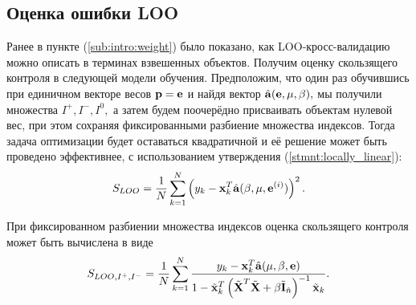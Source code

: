 
\subsection{Оценка ошибки LOO}
Ранее в пункте (\ref{sub:intro:weight}) было показано, как LOO-кросс-валидацию можно описать в терминах взвешенных объектов.
Получим оценку скользящего контроля в следующей модели обучения. Предположим, что один раз обучившись при единичном векторе весов $\boldsymbol{\mathbf{p}} = \boldsymbol{\mathbf{e}}$ и найдя вектор $\hat{\boldsymbol{\mathbf{a}}}(\boldsymbol{\mathbf{e}}, {\mu,\beta}),$ мы получили множества $I^+, I^-, I^0,$ а затем будем поочерёдно присваивать объектам нулевой вес, при этом сохраняя фиксированными разбиение множества индексов. Тогда задача оптимизации будет оставаться квадратичной и её решение может быть проведено эффективнее, с использованием утверждения (\ref{stmnt:locally_linear}):
\begin{equation}
	S_{LOO} = \frac1N\sum\limits_{k=1}^N \left(y_k - \boldsymbol{\mathbf{x}}_k^T\hat{\boldsymbol{\mathbf{a}}}(\beta, \mu, \boldsymbol{\mathbf{e}}^{(i)})\right)^2.
\end{equation}




\begin{statement}
При фиксированном разбиении множества индексов оценка скользящего контроля может быть вычислена в виде
\begin{equation*}
	S_{LOO, I^+, I^-} = \frac1N\sum\limits_{k=1}^N\frac{y_k - \boldsymbol{\mathbf{x}}_k^T\hat{\boldsymbol{\mathbf{a}}}({\mu,\beta}, \boldsymbol{\mathbf{e}})}{1 - \tilde{\boldsymbol{\mathbf{x}}}_k^T\left(\tilde{\boldsymbol{\mathbf{X}}}^T\tilde{\boldsymbol{\mathbf{X}}} + \beta \tilde{\boldsymbol{\mathbf{I}}}_{\hat n}\right)^{-1}\tilde{\boldsymbol{\mathbf{x}}}_k}.
\end{equation*}
\end{statement}

